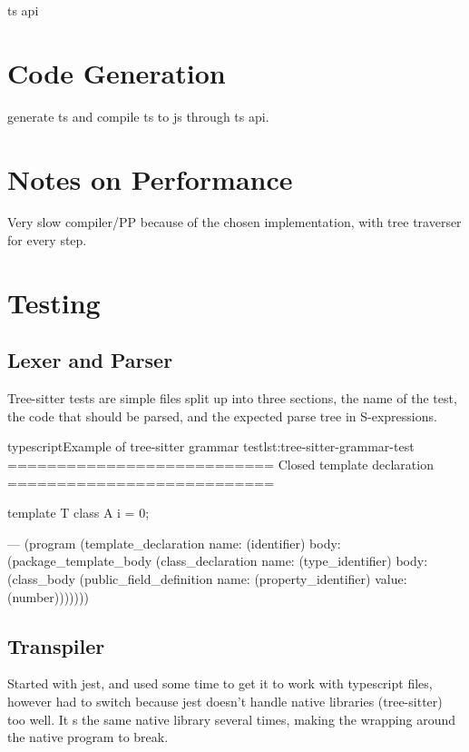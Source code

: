 ts api

\section{Code Generation}\label{sec:code-generation}

generate ts and compile ts to js through ts api.

\section{Notes on Performance}\label{sec:notes-on-performance}

Very slow compiler/PP because of the chosen implementation, with tree traverser for every step.


\section{Testing}\label{sec:testing}

\subsection{Lexer and Parser}\label{subsec:testing-lexer-and-parser}

Tree-sitter tests are simple  files split up into three sections, the name of the test, the code that should be parsed, and the expected parse tree in S-expressions\cite{sexprs}.

\begin{code}{typescript}{Example of tree-sitter grammar test}{lst:tree-sitter-grammar-test}
    ===========================
    Closed template declaration
    ===========================

    template T {
        class A {
            i = 0;
        }
    }

    ---
    (program
        (template_declaration
            name: (identifier)
            body: (package_template_body
                    (class_declaration
                        name: (type_identifier)
                        body: (class_body
                            (public_field_definition
                                name: (property_identifier)
                                value: (number)))))))

\end{code}

\subsection{Transpiler}\label{subsec:testing-transpiler}

Started with jest, and used some time to get it to work with typescript files, however had to switch because jest doesn't handle native libraries (tree-sitter) too well.
It s the same native library several times, making the wrapping around the native program to break.